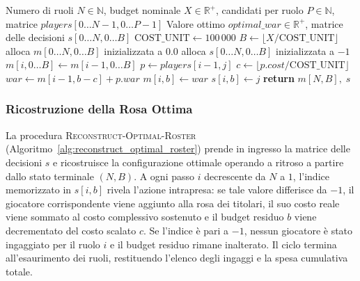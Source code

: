 \begin{algorithm}[H]
	\small
	\caption{Calcolo del WAR Ottimale e della Tabella delle Scelte}
	\label{alg:compute_optimal_war}
	\begin{algorithmic}[1]
		\Require Numero di ruoli $N \in \mathbb{N}$, budget nominale $X \in \mathbb{R}^+$, candidati per ruolo $P \in \mathbb{N}$, matrice $\mathit{players}[0 \dots N-1, 0 \dots P-1]$
		\Ensure Valore ottimo $\mathit{optimal\_war} \in \mathbb{R}^+$, matrice delle decisioni $s[0 \dots N, 0 \dots B]$
		\State $\text{COST\_UNIT} \gets 100\,000$
		\State $B \gets \lfloor X / \text{COST\_UNIT} \rfloor$
		\State alloca $m[0 \dots N, 0 \dots B]$ inizializzata a $0.0$
		\State alloca $s[0 \dots N, 0 \dots B]$ inizializzata a $-1$
		 
		\State $m[i, 0 \dots B] \gets m[i - 1, 0 \dots B]$ 
		 
		\State $p \gets \mathit{players}[i - 1, j]$
		\State $c \gets \lfloor p.\mathit{cost} / \text{COST\_UNIT} \rfloor$
		 
		\State $\mathit{war} \gets m[i - 1, b - c] + p.\mathit{war}$
		\State $m[i, b] \gets \mathit{war}$
		\State $s[i, b] \gets j$ 
		\EndIf
		\EndFor
		\EndFor
		\EndFor
		\State \textbf{return} $m[N, B], \; s$
		\EndProcedure
	\end{algorithmic}
\end{algorithm}

\subsubsection{Ricostruzione della Rosa Ottima}
La procedura \textsc{Reconstruct-Optimal-Roster} (Algoritmo~\ref{alg:reconstruct_optimal_roster}) prende in ingresso la matrice delle decisioni $s$ e ricostruisce la configurazione ottimale operando a ritroso a partire dallo stato terminale $(N, B)$. A ogni passo $i$ decrescente da $N$ a $1$, l'indice memorizzato in $s[i, b]$ rivela l'azione intrapresa: se tale valore differisce da $-1$, il giocatore corrispondente viene aggiunto alla rosa dei titolari, il suo costo reale viene sommato al costo complessivo sostenuto e il budget residuo $b$ viene decrementato del costo scalato $c$. Se l'indice è pari a $-1$, nessun giocatore è stato ingaggiato per il ruolo $i$ e il budget residuo rimane inalterato. Il ciclo termina all'esaurimento dei ruoli, restituendo l'elenco degli ingaggi e la spesa cumulativa totale.

